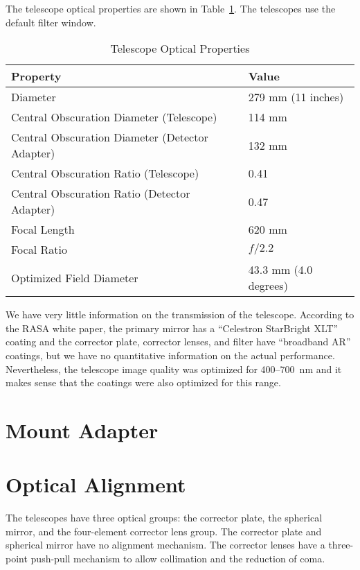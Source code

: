 The telescope optical properties are shown in Table~\ref{table:telescope-optical-properties}. The telescopes use the default filter window.

\begin{table}
\caption{Telescope Optical Properties}
\label{table:telescope-optical-properties}
\begin{center}
\begin{tabular}{ll}
\hline
\hline
Property&Value\\
\hline
Diameter&279 mm (11 inches)\\
Central Obscuration Diameter (Telescope)&114 mm\\
Central Obscuration Diameter (Detector Adapter)&132 mm\\
Central Obscuration Ratio (Telescope)&0.41\\
Central Obscuration Ratio (Detector Adapter)&0.47\\
Focal Length&620 mm\\
Focal Ratio&$f/2.2$\\
Optimized Field Diameter&43.3 mm (4.0 degrees)\\
\hline
\end{tabular}
\end{center}
\end{table}

We have very little information on the transmission of the telescope. According to the RASA white paper, the primary mirror has a “Celestron StarBright XLT” coating and the corrector plate, corrector lenses, and filter have “broadband AR” coatings, but we have no quantitative information on the actual performance. Nevertheless, the telescope image quality was optimized for 400--700~nm and it makes sense that the coatings were also optimized for this range.

\section{Mount Adapter}

\section{Optical Alignment}

The telescopes have three optical groups: the corrector plate, the spherical mirror, and the four-element corrector lens group. The corrector plate and spherical mirror have no alignment mechanism. The corrector lenses have a three-point push-pull mechanism to allow collimation and the reduction of coma.

